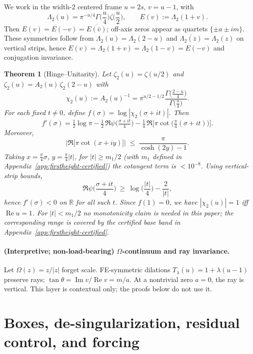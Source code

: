\documentclass[11pt]{article}
\numberwithin{equation}{section}
\newtheorem{theorem}{Theorem}[section]
\theoremstyle{remark}
\DeclareMathOperator{\Imag}{Im}
\DeclareMathOperator{\Real}{Re}
\newcommand{\LamTwo}{\Lambda_2}
\newcommand{\chiTwo}{\chi_2}
\begin{document}
We work in the width-2 centered frame $u=2s$, $v=u-1$, with
\[
\LamTwo(u)=\pi^{-u/4}\Gamma\!\Big(\frac{u}{4}\Big)\zeta\!\Big(\frac{u}{2}\Big),
\qquad
E(v):=\LamTwo(1+v).
\]
Then $E(v)=E(-v)=\overline{E(\bar v)}$; off-axis zeros appear as quartets $\{\pm a\pm im\}$. %
These symmetries follow from $\LamTwo(u)=\LamTwo(2-u)$ and $\overline{\LamTwo(\overline z)}=\LamTwo(z)$ on vertical strips, hence $E(v)=\LamTwo(1+v)=\LamTwo(1-v)=E(-v)$ and conjugation invariance.

\begin{theorem}[Hinge--Unitarity]\label{thm:hinge}
Let $\zeta_2(u)=\zeta(u/2)$ and $\zeta_2(u)=A_2(u)\,\zeta_2(2-u)$ with
\[
\chiTwo(u):=A_2(u)^{-1}=\pi^{u/2-1/2}\frac{\Gamma\big(\frac{2-u}{4}\big)}{\Gamma\big(\frac{u}{4}\big)}.
\]
For each fixed $t\neq 0$, define $f(\sigma)=\log|\chi_2(\sigma+it)|$. Then
\[
f'(\sigma)=\tfrac12\log\pi-\tfrac12\,\Re\psi\!\Big(\tfrac{\sigma+it}{4}\Big)
-\tfrac14\,\Re\!\Big[\pi\cot\!\Big(\tfrac{\pi}{4}(\sigma+it)\Big)\Big].
\]
Moreover,
\[
\big|\Re\!\big[\pi\cot(x+iy)\big]\big|\;\le\;\frac{\pi}{\cosh(2y)-1}.
\]
Taking $x=\frac{\pi}{4}\sigma$, $y=\frac{\pi}{4}|t|$, for $|t|\ge m_1/2$ \emph{(with $m_1$ defined in Appendix~\ref{app:firstheight-certified})} %
the cotangent term is $<10^{-8}$. Using vertical-strip bounds,
\[
\Re\psi\!\Big(\frac{\sigma+it}{4}\Big)\ \ge\ \log\!\Big(\frac{|t|}{4}\Big)-\frac{2}{|t|},
\]
hence $f'(\sigma)<0$ on $\mathbb R$ for all such $t$. Since $f(1)=0$, we have $|\chi_2(u)|=1$ iff $\Real u=1$. %
For $|t|<m_1/2$ no monotonicity claim is needed in this paper; the corresponding range is covered by the certified base band in Appendix~\ref{app:firstheight-certified}.
\end{theorem}

\paragraph{(Interpretive; non-load-bearing) $\Omega$-continuum and ray invariance.}
Let $\Omega(z)=z/|z|$ forget scale. FE-symmetric dilations $T_\lambda(u)=1+\lambda(u-1)$ preserve rays; $\tan\theta=\Imag v/\Real v=m/a$. At a nontrivial zero $a=0$, the ray is vertical. This layer is contextual only; the proofs below do not use it.

\section{Boxes, de-singularization, residual control, and forcing}\label{sec:boxes}
\end{document}
